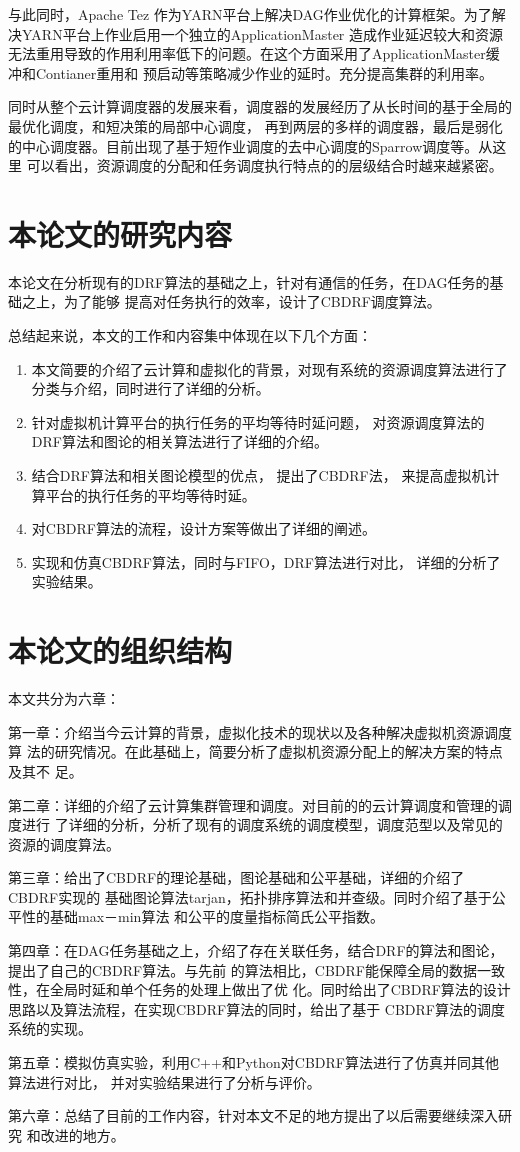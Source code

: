 与此同时，Apache Tez 作为YARN平台上解决DAG作业优化的计算框架。为了解决YARN平台上作业启用一个独立的ApplicationMaster
造成作业延迟较大和资源无法重用导致的作用利用率低下的问题。在这个方面采用了ApplicationMaster缓冲和Contianer重用和
预启动等策略减少作业的延时。充分提高集群的利用率。

同时从整个云计算调度器的发展来看，调度器的发展经历了从长时间的基于全局的最优化调度，和短决策的局部中心调度，
再到两层的多样的调度器，最后是弱化的中心调度器。目前出现了基于短作业调度的去中心调度的Sparrow调度等。从这里
可以看出，资源调度的分配和任务调度执行特点的的层级结合时越来越紧密。

\section{本论文的研究内容}

本论文在分析现有的DRF算法的基础之上，针对有通信的任务，在DAG任务的基础之上，为了能够
提高对任务执行的效率，设计了CBDRF调度算法。

总结起来说，本文的工作和内容集中体现在以下几个方面：
\begin{enumerate}
  \item 本文简要的介绍了云计算和虚拟化的背景，对现有系统的资源调度算法进行了
	分类与介绍，同时进行了详细的分析。
  \item 针对虚拟机计算平台的执行任务的平均等待时延问题，
	对资源调度算法的DRF算法和图论的相关算法进行了详细的介绍。
  \item 结合DRF算法和相关图论模型的优点，
	提出了CBDRF法，
	来提高虚拟机计算平台的执行任务的平均等待时延。
  \item 对CBDRF算法的流程，设计方案等做出了详细的阐述。
  \item 实现和仿真CBDRF算法，同时与FIFO，DRF算法进行对比，
	详细的分析了实验结果。
\end{enumerate}


\section{本论文的组织结构}
本文共分为六章：

第一章：介绍当今云计算的背景，虚拟化技术的现状以及各种解决虚拟机资源调度算
法的研究情况。在此基础上，简要分析了虚拟机资源分配上的解决方案的特点及其不
足。

第二章：详细的介绍了云计算集群管理和调度。对目前的的云计算调度和管理的调度进行
了详细的分析，分析了现有的调度系统的调度模型，调度范型以及常见的资源的调度算法。

第三章：给出了CBDRF的理论基础，图论基础和公平基础，详细的介绍了CBDRF实现的
基础图论算法tarjan，拓扑排序算法和并查级。同时介绍了基于公平性的基础max－min算法
和公平的度量指标简氏公平指数。

第四章：在DAG任务基础之上，介绍了存在关联任务，结合DRF的算法和图论，提出了自己的CBDRF算法。与先前
的算法相比，CBDRF能保障全局的数据一致性，在全局时延和单个任务的处理上做出了优
化。同时给出了CBDRF算法的设计思路以及算法流程，在实现CBDRF算法的同时，给出了基于
CBDRF算法的调度系统的实现。

第五章：模拟仿真实验，利用C++和Python对CBDRF算法进行了仿真并同其他算法进行对比，
并对实验结果进行了分析与评价。

第六章：总结了目前的工作内容，针对本文不足的地方提出了以后需要继续深入研究
和改进的地方。
